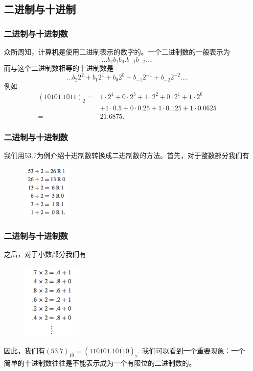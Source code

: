 \documentclass[10pt]{beamer}
\begin{document}
\subsection{二进制与十进制}
\begin{frame}
\frametitle{二进制与十进制数}
众所周知，计算机是使用二进制表示的数字的。一个二进制数的一般表示为
\begin{equation}
\ldots b_2 b_1 b_0. b_{-1}b_{-2} \ldots.
\end{equation}
而与这个二进制数相等的十进制数是
\begin{equation}
\ldots b_2 2^2 + b_1 2^1 + b_0 2^0 + b_{-1} 2^{-1} + b_{-2} 2^{-2} \ldots.
\end{equation}
例如
\begin{align}
(10101.1011)_2 = &1\cdot 2^4 + 0\cdot 2^3 + 1 \cdot 2^2 + 0 \cdot 2^1 + 1 \cdot 2^0  \nonumber \\
                             &+ 1\cdot 0.5 + 0\cdot0.25 + 1\cdot 0.125 + 1 \cdot 0.0625 \nonumber \\
                          = & 21.6875.
\end{align}

\end{frame}

\begin{frame}
\frametitle{二进制与十进制数}
我们用53.7为例介绍十进制数转换成二进制数的方法。首先，对于整数部分我们有
\begin{figure}
\includegraphics[width=2.5cm]{figs/decimal_to_binary_1.png} 
\end{figure}

\end{frame}

\begin{frame}
\frametitle{二进制与十进制数}
之后，对于小数部分我们有
\begin{figure}
\includegraphics[width=3cm]{figs/decimal_to_binary_2.png} 
\end{figure}
因此，我们有$(53.7)_{10} = (110101.1\overline{0110})_2$. 我们可以看到一个重要现象：一个简单的十进制数往往是不能表示成为一个有限位的二进制数的。

\end{frame}
\end{document}
